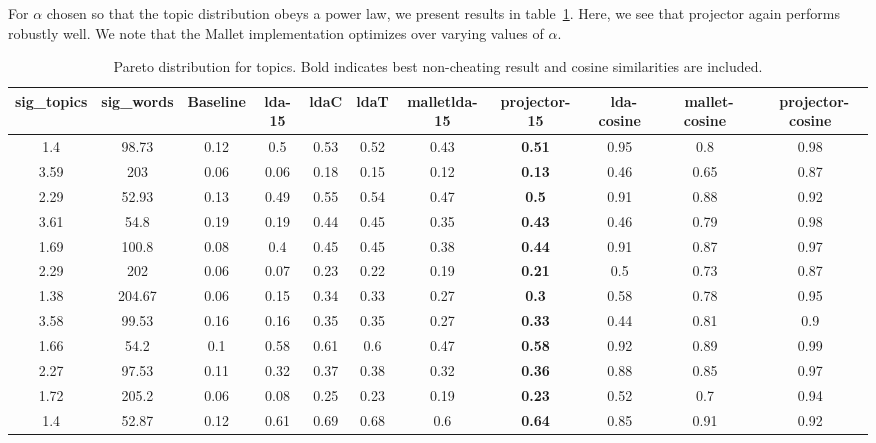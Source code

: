 For $\alpha$ chosen so that the topic distribution obeys a power
law, we present results in table~\ref{tab:pareto}. Here, we see that
projector again performs robustly well.  We note that 
the Mallet implementation optimizes over varying values of
$\alpha$. 

\begin{table}
{\tiny
\begin{tabular}{|c|c|c|c|c|c|c|c|c|c|c|}
\hline 
sig\_topics &sig\_words &Baseline &lda-15 &ldaC &ldaT &malletlda-15 &projector-15 &~lda-cosine &~mallet-cosine &~projector-cosine \\
 \hline 
1.4  &98.73  &{0.12}
  &{0.5}
  &{0.53}
  &{0.52}
  &{0.43}
  &\textbf{0.51}
  &0.95  &0.8  &0.98  \\
 \hline 
3.59  &203  &{0.06}
  &{0.06}
  &{0.18}
  &{0.15}
  &{0.12}
  &\textbf{0.13}
  &0.46  &0.65  &0.87  \\
 \hline 
2.29  &52.93  &{0.13}
  &{0.49}
  &{0.55}
  &{0.54}
  &{0.47}
  &\textbf{0.5}
  &0.91  &0.88  &0.92  \\
 \hline 
3.61  &54.8  &{0.19}
  &{0.19}
  &{0.44}
  &{0.45}
  &{0.35}
  &\textbf{0.43}
  &0.46  &0.79  &0.98  \\
 \hline 
1.69  &100.8  &{0.08}
  &{0.4}
  &{0.45}
  &{0.45}
  &{0.38}
  &\textbf{0.44}
  &0.91  &0.87  &0.97  \\
 \hline 
2.29  &202  &{0.06}
  &{0.07}
  &{0.23}
  &{0.22}
  &{0.19}
  &\textbf{0.21}
  &0.5  &0.73  &0.87  \\
 \hline 
1.38  &204.67  &{0.06}
  &{0.15}
  &{0.34}
  &{0.33}
  &{0.27}
  &\textbf{0.3}
  &0.58  &0.78  &0.95  \\
 \hline 
3.58  &99.53  &{0.16}
  &{0.16}
  &{0.35}
  &{0.35}
  &{0.27}
  &\textbf{0.33}
  &0.44  &0.81  &0.9  \\
 \hline 
1.66  &54.2  &{0.1}
  &{0.58}
  &{0.61}
  &{0.6}
  &{0.47}
  &\textbf{0.58}
  &0.92  &0.89  &0.99  \\
 \hline 
2.27  &97.53  &{0.11}
  &{0.32}
  &{0.37}
  &{0.38}
  &{0.32}
  &\textbf{0.36}
  &0.88  &0.85  &0.97  \\
 \hline 
1.72  &205.2  &{0.06}
  &{0.08}
  &{0.25}
  &{0.23}
  &{0.19}
  &\textbf{0.23}
  &0.52  &0.7  &0.94  \\
 \hline 
1.4  &52.87  &{0.12}
  &{0.61}
  &{0.69}
  &{0.68}
  &{0.6}
  &\textbf{0.64}
  &0.85  &0.91  &0.92  \\
 \hline 

\end{tabular}
}

\caption{Pareto distribution for topics. Bold indicates best non-cheating result
and cosine similarities are included.}
\label{tab:pareto}
\end{table}

